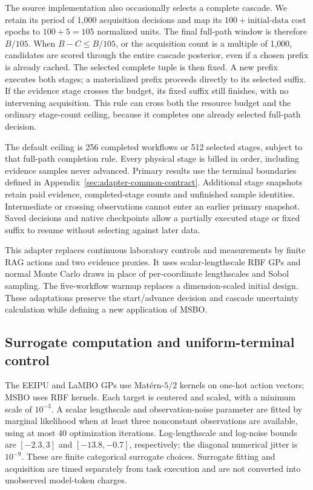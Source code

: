 The source implementation also occasionally selects a complete cascade.
We retain its period of 1,000 acquisition decisions and map its
$100+\text{initial-data}$ cost epochs to $100+5=105$ normalized units.
The final full-path window is therefore $B/105$. When $B-C\leq B/105$, or
the acquisition count is a multiple of 1,000, candidates are scored through
the entire cascade posterior, even if a chosen prefix is already cached.
The selected complete tuple is then fixed. A new prefix executes both
stages; a materialized prefix proceeds directly to its selected suffix.
If the evidence stage crosses the budget, its fixed suffix still finishes,
with no intervening acquisition. This rule can cross both the resource
budget and the ordinary stage-count ceiling, because it completes one
already selected full-path decision.

The default ceiling is 256 completed workflows or 512 selected stages,
subject to that full-path completion rule. Every physical stage is billed
in order, including evidence samples never advanced. Primary results use
the terminal boundaries defined in Appendix~\ref{sec:adapter-common-contract}.
Additional stage snapshots retain paid evidence, completed-stage counts
and unfinished sample identities. Intermediate or crossing observations
cannot enter an earlier primary snapshot. Saved decisions and native
checkpoints allow a partially executed stage or fixed suffix to resume
without selecting against later data.

This adapter replaces continuous laboratory controls and measurements by
finite RAG actions and two evidence proxies. It uses scalar-lengthscale RBF
GPs and normal Monte Carlo draws in place of per-coordinate lengthscales
and Sobol sampling. The five-workflow warmup replaces a dimension-scaled
initial design. These adaptations preserve the start/advance decision and
cascade uncertainty calculation while defining a new application of MSBO.

\subsection{Surrogate computation and uniform-terminal control}
The EEIPU and LaMBO GPs use Mat\'ern-$5/2$ kernels on one-hot action
vectors; MSBO uses RBF kernels. Each target is centered and scaled, with a
minimum scale of $10^{-3}$. A scalar lengthscale and observation-noise
parameter are fitted by marginal likelihood when at least three
nonconstant observations are available, using at most 40 optimization
iterations. Log-lengthscale and log-noise bounds are $[-2.3,3]$ and
$[-13.8,-0.7]$, respectively; the diagonal numerical jitter is $10^{-9}$.
These are finite categorical surrogate choices. Surrogate
fitting and acquisition are timed separately from task execution and are
not converted into unobserved model-token charges.

